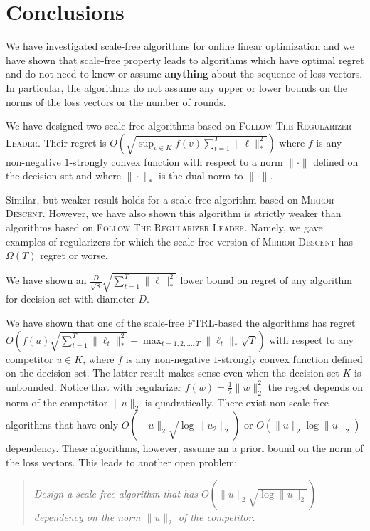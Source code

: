\section{Conclusions}
\label{section:conclusions}

We have investigated scale-free algorithms for online linear optimization and
we have shown that scale-free property leads to algorithms which have optimal
regret and do not need to know or assume \textbf{anything} about the sequence
of loss vectors. In particular, the algorithms do not assume any upper or lower
bounds on the norms of the loss vectors or the number of rounds.

We have designed two scale-free algorithms based on \textsc{Follow The
Regularizer Leader}.  Their regret is $O \left(\sqrt{\sup_{v \in K} f(v)
\sum_{t=1}^T \|\ell\|_*^2} \right)$ where $f$ is any non-negative $1$-strongly
convex function with respect to a norm $\|\cdot\|$ defined on the decision set
and where $\|\cdot\|_*$ is the dual norm to $\|\cdot\|$.

Similar, but weaker result holds for a scale-free algorithm based on
\textsc{Mirror Descent}. However, we have also shown this algorithm is strictly
weaker than algorithms based on \textsc{Follow The Regularizer Leader}. Namely,
we gave examples of regularizers for which the scale-free version of
\textsc{Mirror Descent} has $\Omega(T)$ regret or worse.

We have shown an $\frac{D}{\sqrt{8}} \sqrt{\sum_{t=1}^T \|\ell\|_*^2}$
lower bound on regret of any algorithm for decision set with diameter $D$.

We have shown that one of the scale-free \textsc{FTRL}-based the algorithms has
regret $O \left(f(u) \sqrt{\sum_{t=1}^T \|\ell_t\|_*^2} + \max_{t=1,2,\dots,T}
\|\ell_t\|_* \sqrt{T} \right)$ with respect to any competitor $u \in K$, where
$f$ is any non-negative $1$-strongly convex function defined on the decision
set.  The latter result makes sense even when the decision set $K$ is
unbounded. Notice that with regularizer $f(w) = \frac{1}{2}\|w\|_2^2$ the
regret depends on norm of the competitor $\|u\|_2$ is quadratically. There
exist non-scale-free algorithms \cite{ McMahan-Streeter-2012,
McMahan-Abernethy-2013, Orabona-2013, McMahan-Orabona-2014, Orabona-2014} that
have only $O(\|u\|_2 \sqrt{\log \|u_2\|_2})$ or $O(\|u\|_2 \log \|u\|_2)$
dependency.  These algorithms, however, assume an a priori bound on the norm of
the loss vectors.  This leads to another open problem:
%
\begin{quotation}
\noindent
\emph{Design a scale-free algorithm that has $O(\|u\|_2 \sqrt{\log \|u\|_2})$
dependency on the norm $\|u\|_2$ of the competitor.}
\end{quotation}
